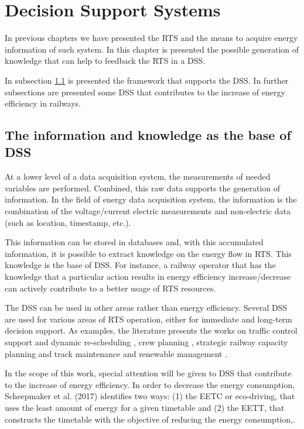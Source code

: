 


\section{Decision Support Systems}
In previous chapters we have presented the \ac{RTS} and the means to acquire energy information of such system.
In this chapter is presented the possible generation of knowledge that can help to feedback the \ac{RTS} in a  \ac{DSS}.

In subsection \ref{subs:351} is presented the framework that supports the \ac{DSS}. In further subsections are presented some \ac{DSS} that contributes to the increase of energy efficiency in railways.


\subsection{The information and knowledge as the base of \ac{DSS}}
\label{subs:351}

	At a lower level of a data acquisition system, the measurements of needed variables are performed. 
	Combined, this raw data supports the generation of information.
	In the field of energy data acquisition system, the information is the combination of the voltage/current electric measurements and non-electric data (such as location, timestamp, etc.).
	
	This information can be stored in databases and, with this accumulated information, it is possible to extract knowledge on the energy flow in \ac{RTS}.
	This knowledge is the base of \ac{DSS}. For instance, a railway operator that has the knowledge that a particular action results in energy efficiency increase/decrease can actively contribute to a better usage of \ac{RTS} resources.
	
	The \ac{DSS} can be used in other areas rather than energy efficiency. 	
	Several DSS are used for various areas of \ac{RTS} operation, either for immediate and long-term decision support.
	As examples, the literature presents the works on traffic control support and dynamic re-scheduling \cite{dariano2009, krasemann2012}, crew planning \cite{freling2004}, strategic railway capacity planning \cite{lai2011} and track maintenance and renewable management \cite{guler2013}.
	
	
	In the scope of this work, special attention will be given to \ac{DSS} that contribute to the increase of energy efficiency. In order to decrease the energy consumption, Scheepmaker et al. (2017) identifies two ways: (1) the \ac{EETC} or eco-driving, that uses the least amount of energy for a given timetable and (2) the \ac{EETT}, that constructs the timetable with the objective of reducing the energy consumption,\cite{scheepmaker2017}.
	
